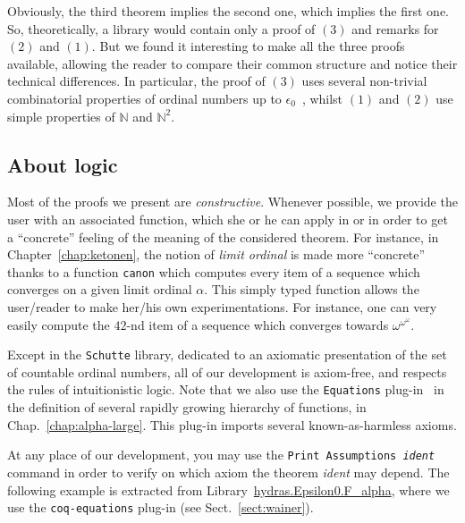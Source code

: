 \documentclass[twoside,a4paper]{book}
\begin{document}
Obviously, the third theorem implies the second one, which implies the first one. So, theoretically, a library would contain only a proof of $(3)$ and remarks for $(2)$ and $(1)$. But we found it interesting to make all the three proofs available, allowing the reader to compare their common structure and notice their technical differences.
In particular, the proof of $(3)$ uses several non-trivial combinatorial properties of ordinal numbers up to $\epsilon_0$~\cite{KS81}, whilst $(1)$ and $(2)$ use simple properties of $\mathbb{N}$ and $\mathbb{N}^2$.


\subsection{About logic}

Most of the proofs we present are \emph{constructive}. Whenever possible, we provide the user with an associated function, which she or he can apply in \gallina{} or \ocaml{} in order to get a ``concrete'' feeling of the meaning of the considered theorem.
For instance, in Chapter~\vref{chap:ketonen}, the notion of \emph{limit ordinal} is
made more ``concrete'' thanks to a function \texttt{canon} which computes every item of a sequence which converges on a given limit ordinal $\alpha$. This simply typed function allows the user/reader to make her/his own experimentations.
For instance, one can very easily compute the $42$-nd item of a sequence which converges towards $\omega^{\omega^\omega}$.


 
Except in the \texttt{Schutte} library, dedicated to an axiomatic presentation of the set of countable ordinal numbers, all of our development is axiom-free, and respects the rules of intuitionistic logic. Note that we also use the \texttt{Equations} plug-in~\cite{sozeau:hal-01671777} in the definition of  several rapidly growing hierarchy of functions, in Chap.~\ref{chap:alpha-large}. This plug-in imports several known-as-harmless  axioms.



At any place of our development, you may use the  \texttt{Print Assumptions {\it ident}} command in order to verify on which axiom the theorem {\it ident} may depend. The following example is extracted from 
Library~\href{../theories/html/hydras.Epsilon0.F_alpha.html}{hydras.Epsilon0.F\_alpha}, where we use the \texttt{coq-equations} plug-in (see Sect.~\vref{sect:wainer}).
\end{document}
